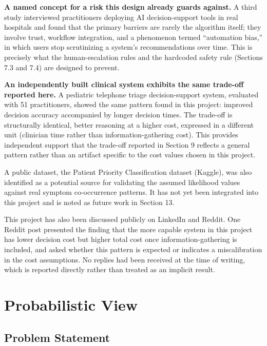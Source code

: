 \documentclass{article}
\begin{document}
\textbf{A named concept for a risk this design already guards against.}
A third study interviewed practitioners deploying AI decision-support
tools in real hospitals and found that the primary barriers are rarely
the algorithm itself; they involve trust, workflow integration, and a
phenomenon termed ``automation bias,'' in which users stop scrutinizing
a system's recommendations over time. This is precisely what the
human-escalation rules and the hardcoded safety rule (Sections 7.3 and
7.4) are designed to prevent.

\textbf{An independently built clinical system exhibits the same
trade-off reported here.} A pediatric telephone triage decision-support
system, evaluated with 51 practitioners, showed the same pattern found
in this project: improved decision accuracy accompanied by longer
decision times. The trade-off is structurally identical, better
reasoning at a higher cost, expressed in a different unit (clinician
time rather than information-gathering cost). This provides independent
support that the trade-off reported in Section 9 reflects a general
pattern rather than an artifact specific to the cost values chosen in
this project.

A public dataset, the Patient Priority Classification dataset (Kaggle),
was also identified as a potential source for validating the assumed
likelihood values against real symptom co-occurrence patterns. It has
not yet been integrated into this project and is noted as future work in
Section 13.

This project has also been discussed publicly on LinkedIn and Reddit.
One Reddit post presented the finding that the more capable system in
this project has lower decision cost but higher total cost once
information-gathering is included, and asked whether this pattern is
expected or indicates a miscalibration in the cost assumptions. No
replies had been received at the time of writing, which is reported
directly rather than treated as an implicit result.

\hypertarget{probabilistic-view}{%
\section{Probabilistic View}\label{probabilistic-view}}

\hypertarget{problem-statement}{%
\subsection{Problem Statement}\label{problem-statement}}
\end{document}

